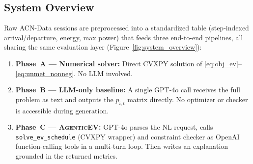 \documentclass{article}
\newcommand{\modelname}{\textsc{AgenticEV}}
\newcommand{\tool}[1]{\texttt{#1}}
\begin{document}
\subsection{System Overview}

Raw ACN-Data sessions are preprocessed into a standardized table (step-indexed arrival/departure, energy, max power) that feeds three end-to-end pipelines, all sharing the same evaluation layer (Figure~\ref{fig:system_overview}):
\begin{enumerate}
  \item \textbf{Phase~A — Numerical solver:} Direct CVXPY solution of \eqref{eq:obj_ev}--\eqref{eq:unmet_nonneg}. No LLM involved.
  \item \textbf{Phase~B — LLM-only baseline:} A single GPT-4o call receives the full problem as text and outputs the $p_{i,t}$ matrix directly. No optimizer or checker is accessible during generation.
  \item \textbf{Phase~C — \modelname{}:} GPT-4o parses the NL request, calls \tool{solve\_ev\_schedule} (CVXPY wrapper) and constraint checker as OpenAI function-calling tools in a multi-turn loop. Then writes an explanation grounded in the returned metrics.
\end{enumerate}
\end{document}
